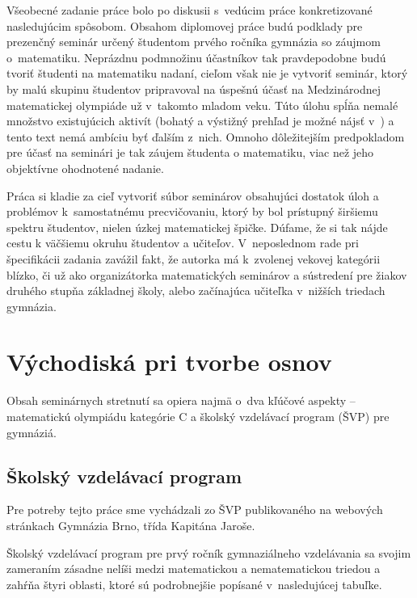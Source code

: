 Všeobecné zadanie práce bolo po diskusii s~vedúcim práce konkretizované nasledujúcim spôsobom. Obsahom diplomovej práce budú podklady pre prezenčný seminár určený študentom prvého ročníka gymnázia so záujmom o~matematiku. Neprázdnu podmnožinu účastníkov tak pravdepodobne budú tvoriť študenti na matematiku nadaní, cieľom však nie je vytvoriť seminár, ktorý by malú skupinu študentov pripravoval na úspešnú účasť na Medzinárodnej matematickej olympiáde už v~takomto mladom veku. Túto úlohu spĺňa nemalé množstvo existujúcich aktivít (bohatý a výstižný prehľad je možné nájsť v~\cite{svrcek2014}) a tento text nemá ambíciu byť ďalším z~nich. Omnoho dôležitejším predpokladom pre účasť na seminári je tak záujem študenta o matematiku, viac než jeho objektívne ohodnotené nadanie.

Práca si kladie za cieľ vytvoriť súbor seminárov obsahujúci dostatok úloh a problémov k~samostatnému precvičovaniu, ktorý by bol prístupný širšiemu spektru študentov, nielen úzkej matematickej špičke. Dúfame, že si tak nájde cestu k väčšiemu okruhu študentov a učiteľov. V~neposlednom rade pri špecifikácii zadania zavážil fakt, že autorka má k~zvolenej vekovej kategórii blízko, či už ako organizátorka matematických seminárov a sústredení pre žiakov druhého stupňa základnej školy, alebo začínajúca učiteľka v~nižších triedach gymnázia.

\newpage

\section{Východiská pri tvorbe osnov}
Obsah seminárnych stretnutí sa opiera najmä o~dva kľúčové aspekty -- matematickú olympiádu kategórie C a školský vzdelávací program (ŠVP) pre gymnáziá.

\subsection*{Školský vzdelávací program}

Pre potreby tejto práce sme vychádzali zo ŠVP publikovaného na webových stránkach Gymnázia Brno, třída Kapitána Jaroše.

Školský vzdelávací program pre prvý ročník gymnaziálneho vzdelávania sa svojim zameraním zásadne nelíši medzi matematickou a nematematickou triedou a zahŕňa štyri oblasti, ktoré sú podrobnejšie popísané v~nasledujúcej tabuľke.


